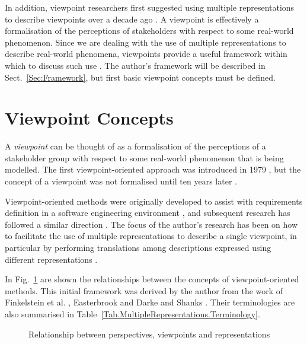 \documentclass[10pt]{llncs}
\begin{document}

In addition, viewpoint researchers first suggested using multiple representations to describe viewpoints over a decade ago \cite{Fink:ACW:1989}. A viewpoint is effectively a formalisation of the perceptions of stakeholders with respect to some real-world phenomenon. Since we are dealing with the use of multiple representations to describe real-world phenomena, viewpoints provide a useful framework within which to discuss such use \cite{Stan:N:1997:ECIS97}. The author's framework will be described in Sect.~\ref{Sec:Framework}, but first basic viewpoint concepts must be defined.


\section{Viewpoint Concepts}
\label{Sec:Viewpoints}

A \emph{viewpoint} can be thought of as a formalisation of the perceptions of a stakeholder group with respect to some real-world phenomenon that is being modelled. The first viewpoint-oriented approach was introduced in 1979 \cite{Mull:G:1979}, but the concept of a viewpoint was not formalised until ten years later \cite{Fink:ACW:1989}.

Viewpoint-oriented methods were originally developed to assist with requirements definition in a software engineering environment \cite{Mull:G:1979}, and subsequent research has followed a similar direction \cite{East:SM:1991:PhD,Koto:G:1996,Nuse:B:1994}. The focus of the author's research has been on how to facilitate the use of multiple representations to describe a single viewpoint, in particular by performing translations among descriptions expressed using different representations \cite{Stan:N:1999:PhD,Stan:N:2000:dp2000-11,Stan:N:1997:ECIS97}.

In Fig.~\ref{Fig.Background.Terminology} are shown the relationships between the concepts of view\-point-oriented methods. This initial framework was derived by the author \cite{Stan:N:1997:ECIS97} from the work of Finkelstein et al. \cite{Fink:ACW:1989}, Easterbrook \cite{East:SM:1991:PhD} and Darke and Shanks \cite{Dark:P:1995}. Their terminologies are also summarised in Table~\ref{Tab.MultipleRepresentations.Terminology}.


\begin{figure}[htb]
	\centering
	\caption{Relationship between perspectives, viewpoints and representations}
	\label{Fig.Background.Terminology}
\end{figure}
\end{document}
